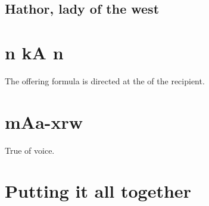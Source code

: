 \subsection*{Hathor, lady of the west}

\section*{n kA n}

The offering formula is directed at the  of the recipient.

\section*{mAa-xrw}

True of voice.

\section*{Putting it all together}